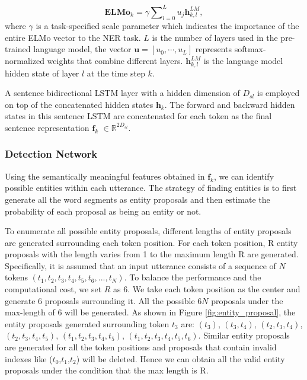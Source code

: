 \documentclass[11pt,a4paper]{article}
\begin{document}
\begin{equation}
    \mathbf{ELMo}_{k} = \gamma \sum\nolimits_{l = 0}^L {{u_j}} \mathbf{h}_{k,l}^{LM},
\end{equation}
where $\gamma$ is a task-specified scale parameter which indicates the importance of the entire ELMo vector to the NER task. $L$ is the number of layers used in the pre-trained language model, the vector $\mathbf{u} = [u_0, \cdots, u_L]$ represents softmax-normalized weights that combine different layers. $\mathbf{h}_{k,l}^{LM}$ is the language model hidden state of layer $l$ at the time step $k$.

A sentence bidirectional LSTM layer with a hidden dimension of $D_{sl}$ is employed on top of the concatenated hidden states $\mathbf{h}_{k}$. The forward and backward hidden states in this sentence LSTM are concatenated for each token as the final sentence representation $\mathbf{f}_{k}$ $\in \mathbb{R}^{2D_{sl}}$.

\subsubsection{Detection Network}
Using the semantically meaningful features obtained in $\mathbf{f}_{k}$, we can identify possible entities within each utterance. The strategy of finding entities is to first generate all the word segments as entity proposals and then estimate the probability of each proposal as being an entity or not. 

To enumerate all possible entity proposals, different lengths of entity proposals are generated surrounding each token position.
For each token position, R entity proposals with the length varies from 1 to the maximum length R are generated.
Specifically, it is assumed that an input utterance consists of a sequence of $N$ tokens $(t_{1}, t_{2}, t_{3}, t_{4}, t_{5}, t_{6}, ..., t_{N})$. 
To balance the performance and the computational cost, we set $R$ as 6.
We take each token position as the center and generate 6 proposals surrounding it. All the possible $6N$ proposals under the max-length of 6 will be generated.
As shown in Figure \ref{fig:entity_proposal}, the entity proposals generated surrounding token $t_3$ are: $(t_{3})$, $(t_{3}, t_{4})$, $(t_{2}, t_{3}, t_{4})$, $(t_{2}, t_{3}, t_{4}, t_{5})$, $(t_{1}, t_{2},  t_{3}, t_{4}, t_{5})$, $(t_{1}, t_{2},  t_{3}, t_{4}, t_{5}, t_{6})$. 
Similar entity proposals are generated for all the token positions and proposals that contain invalid indexes like ($t_{0}$,$t_{1}$,$t_{2}$) will be deleted. Hence we can obtain all the valid entity proposals under the condition that the max length is R.
\end{document}
